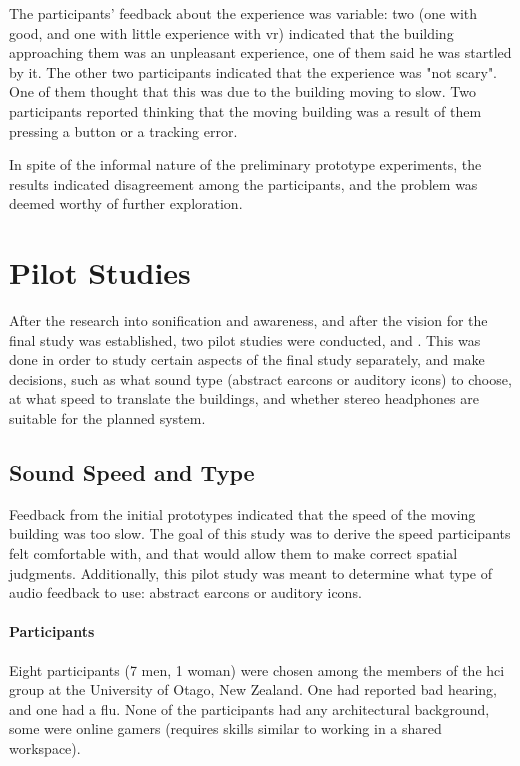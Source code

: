 
The participants' feedback about the experience was variable: two (one with good, and one with little experience with \gls{vr}) indicated that the building approaching them was an unpleasant experience, one of them said he was startled by it. The other two participants indicated that the experience was "not scary". One of them thought that this was due to the building moving to slow. Two participants reported thinking that the moving building was a result of them pressing a button or a tracking error.	

In spite of the informal nature of the preliminary prototype experiments, the results indicated disagreement among the participants, and the problem was deemed worthy of further exploration.


\section{Pilot Studies}
After the research into sonification and awareness, and after the vision for the final  study was established, two pilot studies were conducted,  and . This was done in order to study certain aspects of the final study separately, and make decisions, such as what sound type (abstract earcons or auditory icons) to choose, at what speed to translate the buildings, and whether stereo headphones are suitable for the planned system.

\subsection{Sound Speed and Type}
\label{study_one}
Feedback from the initial prototypes indicated that the speed of the moving building was too slow. The goal of this study was to derive the speed participants felt comfortable with, and that would allow them to make correct spatial judgments. Additionally, this pilot study was meant to determine what type of audio feedback to use: abstract earcons or auditory icons.

\paragraph{Participants}
Eight participants (7 men, 1 woman) were chosen among the members of the \gls{hci} group at the University of Otago, New Zealand. One had reported bad hearing, and one had a flu.  None of the participants had any architectural background, some were online gamers (requires skills similar to working in a shared workspace).


